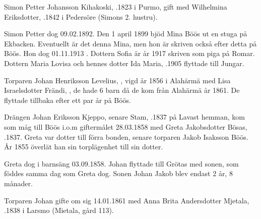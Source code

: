 %
Simon Petter Johansson Kihakoski, .1823 i Purmo, gift med Wilhelmina Eriksdotter, .1842 i Pedersöre (Simons 2. hustru).
\begin{jhchildren}
  \item {}
  \item {}
  \item {}
  \item {}
  \item {}
\end{jhchildren}
Simon Petter dog 09.02.1892. Den 1 april 1899 bjöd Mina Böös ut en stuga på Ekbacken. Eventuellt är det denna Mina, men hon är skriven också efter detta på Böös. Hon dog 01.11.1913 . Dottern Sofia är år 1917 skriven som piga på Romar. Dottern Maria Lovisa och hennes dotter Ida Maria, .1905 flyttade till Jungar.


%
Torparen Johan Henriksson Levelius, , vigd år 1856 i Alahärmä med Lisa Israelsdotter Frändi, , de hade 6 barn då de kom från Alahärmä år 1861. De flyttade tillbaka efter ett par år på Böös.


%
Drängen Johan Eriksson Kjeppo, senare Stam, .1837 på Lavast hemman, kom som måg till Böös i.o.m giftermålet 28.03.1858 med Greta Jakobsdotter Bösas, .1837. Greta var dotter till förra bonden, senare torparen Jakob Isaksson Böös. År 1855 överlät han sin torplägenhet till sin dotter.

Greta dog i barnsäng 03.09.1858. Johan flyttade till Grötas med sonen, som föddes samma dag som Greta dog. Sonen Johan Jakob blev endast 2 år, 8 månader.

Torparen Johan gifte om sig 14.01.1861 med Anna Brita Andersdotter Mjetala, .1838 i Larsmo (Mietala, gård 113).


